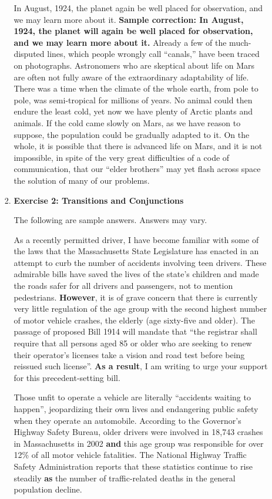 \begin{enumerate}
\begin{itemize}
\begin{enumerate}
In August, 1924, the planet again be well placed for observation, and we may learn more about it. \textbf{Sample correction: In August, 1924, the planet will again be well placed for observation, and we may learn more about it.} Already a few of the much-disputed lines, which people wrongly call ``canals,'' have been traced on photographs. Astronomers who are skeptical about life on Mars are often not fully aware of the extraordinary adaptability of life. There was a time when the climate of the whole earth, from pole to pole, was semi-tropical for millions of years. No animal could then endure the least cold, yet now we have plenty of Arctic plants and animals. If the cold came slowly on Mars, as we have reason to suppose, the population could be gradually adapted to it. On the whole, it is possible that there is advanced life on Mars, and it is not impossible, in spite of the very great difficulties of a code of communication, that our ``elder brothers'' may yet flash across space the solution of many of our problems.

\item \textbf{Exercise 2: Transitions and Conjunctions}

The following are sample answers. Answers may vary.

As a recently permitted driver, I have become familiar with some of the laws that the Massachusetts State Legislature has enacted in an attempt to curb the number of accidents involving teen drivers. These admirable bills have saved the lives of the state's children and made the roads safer for all drivers and passengers, not to mention pedestrians. \textbf{However}, it is of grave concern that there is currently very little regulation of the age group with the second highest number of motor vehicle crashes, the elderly (age sixty-five and older). The passage of proposed Bill 1914 will mandate that ``the registrar shall require that all persons aged 85 or older who are seeking to renew their operator's licenses take a vision and road test before being reissued such license''. \textbf{As a result}, I am writing to urge your support for this precedent-setting bill.  

Those unfit to operate a vehicle are literally ``accidents waiting to happen'', jeopardizing their own lives and endangering public safety when they operate an automobile. According to the Governor's Highway Safety Bureau, older drivers were involved in 18,743 crashes in Massachusetts in 2002 \textbf{and} this age group was responsible for over 12\% of all motor vehicle fatalities. The National Highway Traffic Safety Administration reports that these statistics continue to rise steadily \textbf{as} the number of traffic-related deaths in the general population decline.  
	

\end{enumerate}
\end{itemize}
\end{enumerate}
